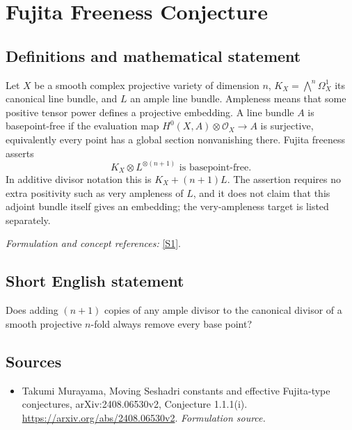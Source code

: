 \documentclass[11pt]{article}
\begin{document}
\section*{\texorpdfstring{Fujita Freeness Conjecture}{Fujita Freeness Conjecture}}\label{30006886}
\subsection{Definitions and mathematical statement}
Let $X$ be a smooth complex projective variety of dimension $n$, $K_X=\bigwedge^n\Omega_X^1$ its canonical line bundle, and $L$ an ample line bundle. Ampleness means that some positive tensor power defines a projective embedding. A line bundle $A$ is basepoint-free if the evaluation map $H^0(X,A)\otimes\mathcal O_X\to A$ is surjective, equivalently every point has a global section nonvanishing there. Fujita freeness asserts
\[
 K_X\otimes L^{\otimes(n+1)}\text{ is basepoint-free}.
\]
In additive divisor notation this is $K_X+(n+1)L$. The assertion requires no extra positivity such as very ampleness of $L$, and it does not claim that this adjoint bundle itself gives an embedding; the very-ampleness target is listed separately.
\par\smallskip\textit{Formulation and concept references:} \href{https://arxiv.org/abs/2408.06530v2}{[S1]}.

\subsection{Short English statement}
Does adding $(n+1)$ copies of any ample divisor to the canonical divisor of a smooth projective $n$-fold always remove every base point?
\subsection{Sources}
\begin{itemize}
\item[S1]Takumi Murayama, Moving Seshadri constants and effective Fujita-type conjectures, arXiv:2408.06530v2, Conjecture 1.1.1(i).
\url{https://arxiv.org/abs/2408.06530v2}.
\textit{Formulation source.}
\end{itemize}
\end{document}

